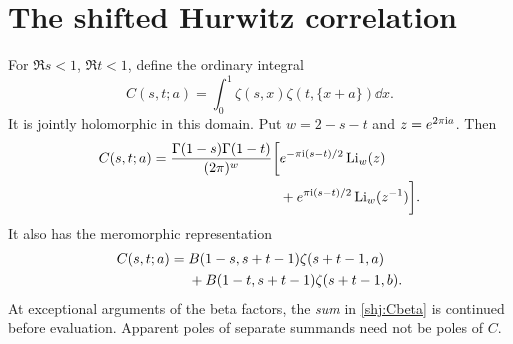\section{The shifted Hurwitz correlation}\label{shj:master}
\begin{proposition}\label{shj:masterthm}
For $\Re s<1$, $\Re t<1$, define the ordinary integral
\begin{equation}\label{shj:Cdef}
C(s,t;a)=\int_0^1\zeta(s,x)\zeta(t,\{x+a\})\dd x.
\end{equation}
It is jointly holomorphic in this domain. Put $w=2-s-t$ and $z=e^{2\pi\mathrm{i} a}$. Then
\begin{align}
C(s,t;a)=\frac{\Gamma(1-s)\Gamma(1-t)}{(2\pi)^w}
\bigg[&e^{-\pi\mathrm{i}(s-t)/2}\operatorname{Li}_w(z)\notag\\
&+e^{\pi\mathrm{i}(s-t)/2}\operatorname{Li}_w(z^{-1})\bigg].
\label{shj:Cpoly}
\end{align}
It also has the meromorphic representation
\begin{align}
C(s,t;a)={}&B(1-s,s+t-1)\zeta(s+t-1,a)\notag\\
&+B(1-t,s+t-1)\zeta(s+t-1,b).
\label{shj:Cbeta}
\end{align}
At exceptional arguments of the beta factors, the \emph{sum} in \eqref{shj:Cbeta} is continued before evaluation. Apparent poles of separate summands need not be poles of $C$.
\end{proposition}
